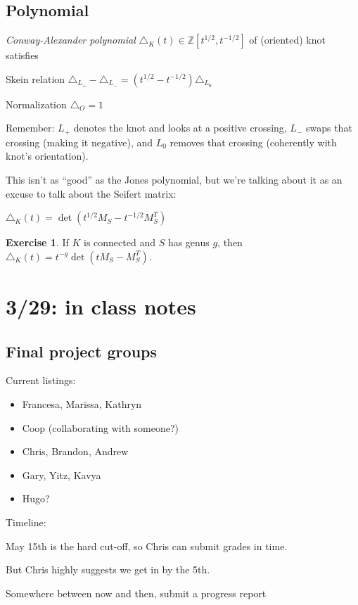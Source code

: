 \documentclass[11pt]{article}
\newcommand{\Z}{\mathbb{Z}}
\theoremstyle{plain}
\theoremstyle{definition}
\newtheorem{exercise}{Exercise}
\begin{document}
\subsection{Polynomial}
\textit{Conway-Alexander polynomial} $\triangle_K(t)\in\Z[t^{1/2},t^{-1/2}]$ of (oriented) knot satisfies

Skein relation $\triangle_{L_+}-\triangle_{L_-}=(t^{1/2}-t^{-1/2})\triangle_{L_0}$

Normalization $\triangle_O=1$

\noindent Remember: $L_+$ denotes the knot and looks at a positive crossing, $L_-$ swaps that crossing (making it negative), and $L_0$ removes that crossing (coherently with knot's orientation).

\bigskip
This isn't as ``good'' as the Jones polynomial, but we're talking about it as an excuse to talk about the Seifert matrix:

$\triangle_K(t)=\det(t^{1/2}M_S-t^{-1/2} M_S^T)$

\begin{exercise}
If $K$ is connected and $S$ has genus $g$, then $\triangle_K(t)=t^{-g}\det(tM_S-M_S^T)$.
\end{exercise}




\section{3/29: in class notes}

\subsection{Final project groups}

Current listings:


\begin{itemize}
  \item Francesa, Marissa, Kathryn
  \item Coop (collaborating with someone?)
  \item Chris, Brandon, Andrew
  \item Gary, Yitz, Kavya
  \item Hugo?
\end{itemize}

Timeline:


May 15th is the hard cut-off, so Chris can submit grades in time.

But Chris highly suggests we get in by the 5th.

Somewhere between now and then, submit a progress report
\end{document}

